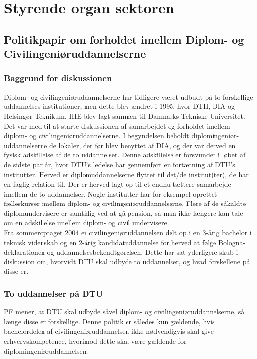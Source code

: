 \section{Styrende organ sektoren}

\subsection{Politikpapir om forholdet imellem Diplom- og Civilingeniøruddannelserne}
\subsubsection{Baggrund for diskussionen}
Diplom- og civilingeniøruddannelserne har tidligere været udbudt på to forskellige uddannelses-institutioner, men dette blev ændret i 1995, hvor DTH, DIA og Helsingør Teknikum, IHE blev lagt sammen til Danmarks Tekniske Universitet.\\

Det var med til at starte diskussionen af samarbejdet og forholdet imellem diplom- og civilingeniøruddannelserne. I begyndelsen beholdt diplomingeniør-uddannelserne de lokaler, der før blev benyttet af DIA, og der var derved en fysisk adskillelse af de to uddannelser. Denne adskillelse er forsvundet i løbet af de sidste par år, hvor DTU’s ledelse har gennemført en fortætning af DTU’s institutter. Herved er diplomuddannelserne flyttet til det/de institut(ter), de har en faglig relation til. Der er herved lagt op til et endnu tættere samarbejde imellem de to uddannelser. Nogle institutter har for eksempel oprettet fælleskurser imellem diplom- og civilingeniøruddannelserne. Flere af de såkaldte diplomundervisere er samtidig ved at gå pension, så man ikke længere kan tale om en adskillelse imellem diplom- og civil undervisere.\\

Fra sommeroptaget 2004 er civilingeniøruddannelsen delt op i en 3-årig bachelor i teknisk videnskab og en 2-årig kandidatuddannelse for herved at følge Bologna-deklarationen og uddannelsesbekendtgørelsen. Dette har sat yderligere skub i diskussion om, hvorvidt DTU skal udbyde to uddannelser, og hvad forskellene på disse er.

\subsubsection{To uddannelser på DTU}
PF mener, at DTU skal udbyde såvel diplom- og civilingeniøruddannelserne, så længe disse er forskellige. Denne politik er således kun gældende, hvis bachelordelen af civilingeniøruddannelsen ikke nødvendigvis skal give erhvervskompetence, hvorimod dette skal være gældende for diplomingeniøruddannelsen.\\

